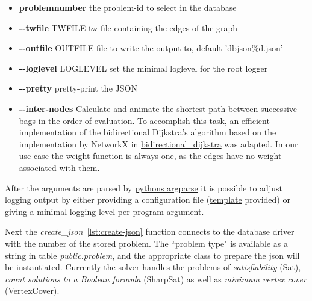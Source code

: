 \documentclass[a4paper, 12pt, bibliography=totoc]{scrartcl}
\begin{document}
\begin{itemize}
	\item
	\textbf{problemnumber}
	 the problem-id to select in the database
	 
	\item
	\textbf{-{}-twfile }TWFILE
	tw-file containing the edges of the graph 
	
	\item
	\textbf{-{}-outfile }OUTFILE
	 file to write the output to, default 'dbjson\%d.json'
	 
	\item
	\textbf{-{}-loglevel }LOGLEVEL
	 set the minimal loglevel for the root logger
	 
	\item
	\textbf{-{}-pretty}
	 pretty-print the JSON
	 
	\item
	\textbf{-{}-inter-nodes}
	Calculate and animate the shortest path between successive bags in the order of evaluation. To accomplish this task, an efficient implementation of the bidirectional Dijkstra's algorithm \cite{shortestPathAlgo} based on the implementation by NetworkX \cite{SciPyProceedings_11} in \href{https://networkx.github.io/documentation/networkx-2.1/reference/algorithms/generated/networkx.algorithms.shortest_paths.weighted.bidirectional_dijkstra.html#networkx.algorithms.shortest_paths.weighted.bidirectional_dijkstra}{bidirectional\_dijkstra} was adapted.
	In our use case the weight function is always one, as the edges have no weight associated with them.
\end{itemize}
After the arguments are parsed by \href{https://docs.python.org/3/library/argparse.html}{pythons argparse} it is possible to adjust logging output by either providing a configuration file (\href{https://github.com/VaeterchenFrost/tdvisu/blob/master/tdvisu/logging.yml}{template} provided) or giving a minimal logging level per program argument.

Next the \textit{create\_json}~\ref{lst:create-json} function connects to the database driver with the number of the stored problem. 
The ``problem type" is available as a string in table \emph{public.problem}, and the appropriate class to prepare the json will be instantiated. Currently the solver handles the problems of \textit{satisfiability} (Sat), \textit{count solutions to a Boolean formula} (SharpSat) as well as \textit{minimum vertex cover} (VertexCover).

\newpage
\end{document}
